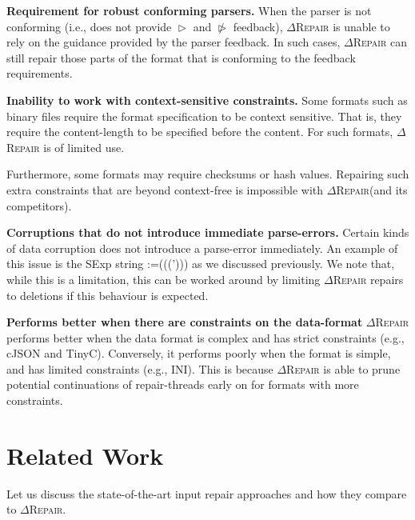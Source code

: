 \documentclass[acmsmall,screen,review,anonymous]{acmart}
\makeatletter
\newcommand{\revise}[1]{\textcolor{black}{#1}}
\def\Rincomplete{\texttt{\color{incompletecolor}\textbf{$\vartriangleright$}}\xspace}
\def\Rincorrect{\texttt{\color{incorrectcolor}\textbf{$\ntriangleright$}}\xspace}
\newcommand{\approach}{\textsc{$\Delta$Repair}\xspace}
\newcommand{\drepair}{\approach}
\newcommand\letterboxed[1]{%
\setlength{\fboxsep}{0pt}%
  \@tfor\@ii:=#1\do{%
    \fcolorbox{light-gray}{white}%
    {\texttt{\strut\@ii}}%
  }%
}
\makeatother
\begin{document}
\noindent\textbf{Requirement for robust conforming parsers.}
When the parser is not conforming (i.e., does not provide \Rincomplete and \Rincorrect feedback), \drepair is unable to rely on the
guidance provided by the parser feedback. In such cases, \drepair can
still repair those parts of the format that is conforming to the feedback
requirements.

\noindent\textbf{Inability to work with context-sensitive constraints.} 
Some formats such as binary files require the format specification to be
context sensitive. That is, they require the content-length to be specified
before the content. For such formats, \drepair is of limited use.

Furthermore,  some formats may require checksums or hash values. Repairing
such extra constraints that are beyond context-free is impossible with
\drepair (and its competitors).


\noindent\textbf{Corruptions that do not introduce immediate parse-errors.}
Certain kinds of data corruption does not introduce a parse-error immediately.
An example of this issue is the SExp string \letterboxed{(((')))} as we discussed
previously.
We note that, while this is a limitation, this can be worked around by limiting
\drepair repairs to deletions if this behaviour is expected.

\noindent\textbf{Performs better when there are constraints on the data-format}
\drepair performs better when the data format is complex and has strict constraints (e.g., cJSON and TinyC).
Conversely, it performs poorly when the format is simple, and has
limited constraints (e.g., INI). This is because \drepair is able to prune
potential continuations of repair-threads early on for formats with
more constraints.

\section{Related Work}
\label{sec:relatedwork}

Let us discuss the state-of-the-art input repair approaches and how they compare to \approach. 
\end{document}

